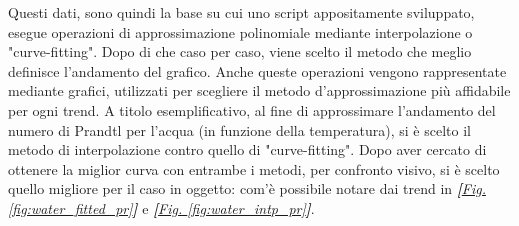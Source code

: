 \documentclass[a4paper,10pt]{article}                                                                                       %
\begin{document}
  Questi dati, sono quindi la base su cui uno script appositamente sviluppato, esegue operazioni di approssimazione
  polinomiale mediante interpolazione o "curve-fitting". Dopo di che caso per caso, viene scelto il metodo che meglio
  definisce l'andamento del grafico. Anche queste operazioni vengono rappresentate mediante grafici, utilizzati per
  scegliere il metodo d'approssimazione più affidabile per ogni trend. A titolo esemplificativo, al fine di approssimare
  l'andamento del numero di Prandtl per l'acqua (in funzione della temperatura), si è scelto il metodo di interpolazione
  contro quello di "curve-fitting". Dopo aver cercato di ottenere la miglior curva con entrambe i metodi, per confronto
  visivo, si è scelto quello migliore per il caso in oggetto: com'è possibile notare dai trend in
  \textit{\textbf{[}\hyperref[fig:water_fitted_pr]{Fig. }\ref{fig:water_fitted_pr}\textbf{]}} e
  \textit{\textbf{[}\hyperref[fig:water_intp_pr]{Fig. }\ref{fig:water_intp_pr}\textbf{]}}.
\end{document}
